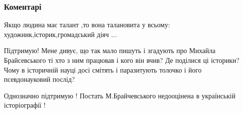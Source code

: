 
 
 
 
 
\subsubsection{Коментарі}

\begin{itemize}
 
Якщо людина має талант ,то вона талановита у всьому: художник,історик,громадський діяч ...

 

Підтримую! Мене дивує, що так мало пишуть і згадують про Михайла Брайсевського
ті хто з ним працював і кого він вчив? Де поділися ці історики? Чому в
історичній науці досі смітять і паразитують толочко і його псевдонауковий
послід?

 
Однозначно підтримую ! Постать М.Брайчевського недооцінена в українській історіографії !
\end{itemize}

